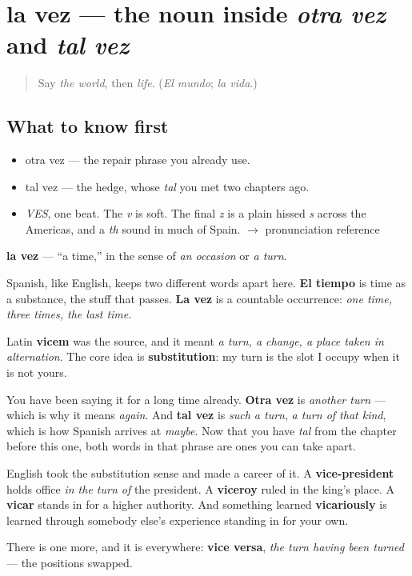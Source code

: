 \section[la vez]{la vez — the noun inside \emph{otra vez} and \emph{tal vez}}

\label{lesson:ES-C330-vez}



\begin{quote}
Say \emph{the world}, then \emph{life}. (\emph{El mundo}; \emph{la vida}.)
\end{quote}

\subsection*{What to know first}
\begin{itemize}
\raggedright
  \item otra vez — the repair phrase you already use.
  \item tal vez — the hedge, whose \emph{tal} you met two chapters ago.
\end{itemize}

\begin{sounds}
\begin{itemize}
\raggedright
  \item \emph{VES}, one beat. The \emph{v} is soft. The final \emph{z} is a plain hissed \emph{s} across the Americas, and a \emph{th} sound in much of Spain. $\to$ pronunciation reference
\end{itemize}
\end{sounds}

\begin{cousinweb}
\textbf{la vez} — \textquotedblleft{}a time,\textquotedblright{} in the sense of \emph{an occasion} or \emph{a turn}.

Spanish, like English, keeps two different words apart here. \textbf{El tiempo} is time as a substance, the stuff that passes. \textbf{La vez} is a countable occurrence: \emph{one time, three times, the last time}.

Latin \textbf{vicem} was the source, and it meant \emph{a turn, a change, a place taken in alternation}. The core idea is \textbf{substitution}: my turn is the slot I occupy when it is not yours.

You have been saying it for a long time already. \textbf{Otra vez} is \emph{another turn} — which is why it means \emph{again}. And \textbf{tal vez} is \emph{such a turn}, \emph{a turn of that kind}, which is how Spanish arrives at \emph{maybe}. Now that you have \emph{tal} from the chapter before this one, both words in that phrase are ones you can take apart.

English took the substitution sense and made a career of it. A \textbf{vice-president} holds office \emph{in the turn of} the president. A \textbf{viceroy} ruled in the king's place. A \textbf{vicar} stands in for a higher authority. And something learned \textbf{vicariously} is learned through somebody else's experience standing in for your own.

There is one more, and it is everywhere: \textbf{vice versa}, \emph{the turn having been turned} — the positions swapped.
\end{cousinweb}

